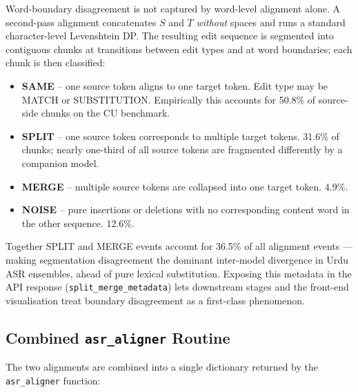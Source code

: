 Word-boundary disagreement is not captured by word-level alignment alone. A second-pass alignment concatenates $S$ and $T$ \emph{without} spaces and runs a standard character-level Levenshtein DP. The resulting edit sequence is segmented into contiguous chunks at transitions between edit types and at word boundaries; each chunk is then classified:

\begin{itemize}
 \item \textbf{SAME} -- one source token aligns to one target token. Edit type may be MATCH or SUBSTITUTION. Empirically this accounts for 50.8\% of source-side chunks on the CU benchmark.
 \item \textbf{SPLIT} -- one source token corresponds to multiple target tokens. 31.6\% of chunks; nearly one-third of all source tokens are fragmented differently by a companion model.
 \item \textbf{MERGE} -- multiple source tokens are collapsed into one target token. 4.9\%.
 \item \textbf{NOISE} -- pure insertions or deletions with no corresponding content word in the other sequence. 12.6\%.
\end{itemize}

Together SPLIT and MERGE events account for 36.5\% of all alignment events --- making segmentation disagreement the dominant inter-model divergence in Urdu ASR ensembles, ahead of pure lexical substitution. Exposing this metadata in the API response (\texttt{split\_merge\_metadata}) lets downstream stages and the front-end visualisation treat boundary disagreement as a first-class phenomenon.

\subsection{Combined \texttt{asr\_aligner} Routine}
\label{ssec:asr-aligner}

The two alignments are combined into a single dictionary returned by the \texttt{asr\_aligner} function:

